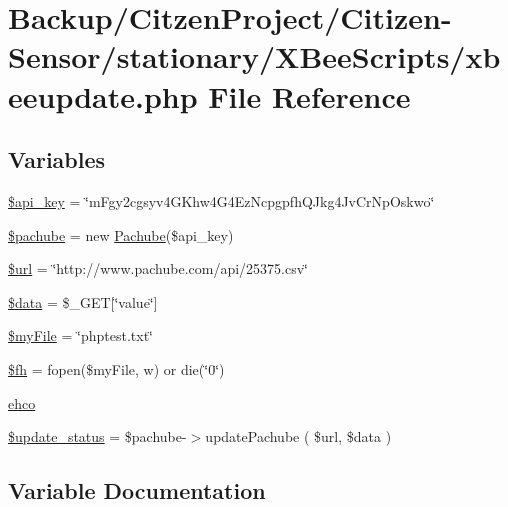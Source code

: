 \hypertarget{xbeeupdate_8php}{}\section{Backup/\+Citzen\+Project/\+Citizen-\/\+Sensor/stationary/\+X\+Bee\+Scripts/xbeeupdate.php File Reference}
\label{xbeeupdate_8php}
\subsection*{Variables}
\begin{DoxyCompactItemize}
\item 
\hyperlink{xbeeupdate_8php_a186dfe06d14a3bc248c4eb4bcdaec562}{\$api\+\_\+key} = \char`\"{}m\+Fgy2cgsyv4\+G\+Khw4\+G4\+Ez\+Ncpgpfh\+Q\+Jkg4\+Jv\+Cr\+Np\+Oskwo\char`\"{}
\item 
\hyperlink{xbeeupdate_8php_a9adc98bad34c320e13c5844ae09f3898}{\$pachube} = new \hyperlink{class_pachube}{Pachube}(\$api\+\_\+key)
\item 
\hyperlink{xbeeupdate_8php_acf215f34a917d014776ce684a9ee8909}{\$url} = \char`\"{}http\+://www.\+pachube.\+com/api/25375.csv\char`\"{}
\item 
\hyperlink{xbeeupdate_8php_a6efc15b5a2314dd4b5aaa556a375c6d6}{\$data} = \$\+\_\+\+G\+ET\mbox{[}\char`\"{}value\char`\"{}\mbox{]}
\item 
\hyperlink{xbeeupdate_8php_aec8c77a99462294dbbfb1639bd8b5165}{\$my\+File} = \char`\"{}phptest.\+txt\char`\"{}
\item 
\hyperlink{xbeeupdate_8php_a015aa0bda28030cbf1a64c0afb88f958}{\$fh} = fopen(\$my\+File, \textquotesingle{}w\textquotesingle{}) or die(\char`\"{}0\char`\"{})
\item 
\hyperlink{xbeeupdate_8php_ab72c8e045a13ad42d78ba1dc5f5f8389}{ehco}
\item 
\hyperlink{xbeeupdate_8php_ae9e1411ff46e859a40f8f1a7646430cf}{\$update\+\_\+status} = \$pachube-\/$>$update\+Pachube ( \$url, \$data )
\end{DoxyCompactItemize}


\subsection{Variable Documentation}
